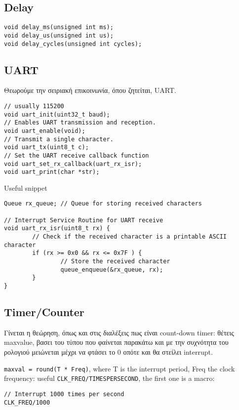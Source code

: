 \documentclass[11pt]{article}
\begin{document}
\subsection{Delay}
\label{sec:org5cb25a7}
\begin{verbatim}
void delay_ms(unsigned int ms);
void delay_us(unsigned int us);
void delay_cycles(unsigned int cycles);
\end{verbatim}
\subsection{UART}
\label{sec:orgb4fc4e7}
Θεωρούμε την σειριακή επικοινωνία, όπου ζητείται, UART.
\begin{verbatim}
// usually 115200
void uart_init(uint32_t baud);
// Enables UART transmission and reception.
void uart_enable(void);
// Transmit a single character.
void uart_tx(uint8_t c);
// Set the UART receive callback function
void uart_set_rx_callback(uart_rx_isr); 
void uart_print(char *str);
\end{verbatim}

Useful snippet
\begin{verbatim}
Queue rx_queue; // Queue for storing received characters

// Interrupt Service Routine for UART receive
void uart_rx_isr(uint8_t rx) {
        // Check if the received character is a printable ASCII character
        if (rx >= 0x0 && rx <= 0x7F ) {
                // Store the received character
                queue_enqueue(&rx_queue, rx);
        }
}
\end{verbatim}
\subsection{Timer/Counter}
\label{sec:orgaffaec3}
\begin{note}
Γίνεται η θεώρηση, όπως και στις διαλέξεις πως είναι count-down timer:
θέτεις maxvalue, βασει του τύπου που φαίνεται παρακάτω και με την
συχνότητα του ρολογιού μειώνεται μέχρι να φτάσει το 0 οπότε και θα
στείλει interrupt.
\label{org91d487b}
\end{note}

\texttt{maxval = round(T * Freq)}, where T is the interrupt period, Freq the clock
frequency: useful \texttt{CLK\_FREQ/TIMESPERSECOND}, the first one is a macro:
\label{org2139baf}
\begin{verbatim}
// Interrupt 1000 times per second
CLK_FREQ/1000
\end{verbatim}
\end{document}
